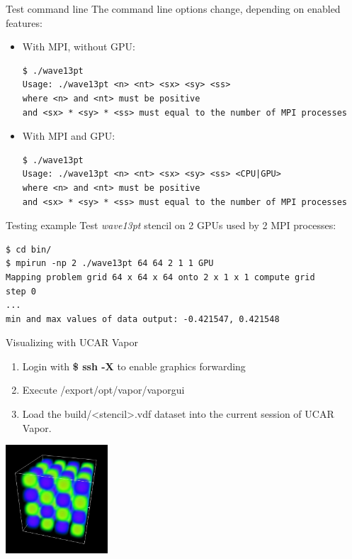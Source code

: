 \documentclass{beamer}
\begin{document}
\begin{frame}[fragile]{Test command line}
The command line options change, depending on enabled features:
\begin{itemize}
\item With MPI, without GPU:
\begin{lstlisting}
$ ./wave13pt
Usage: ./wave13pt <n> <nt> <sx> <sy> <ss>
where <n> and <nt> must be positive
and <sx> * <sy> * <ss> must equal to the number of MPI processes
\end{lstlisting}
\item With MPI and GPU:
\begin{lstlisting}
$ ./wave13pt
Usage: ./wave13pt <n> <nt> <sx> <sy> <ss> <CPU|GPU>
where <n> and <nt> must be positive
and <sx> * <sy> * <ss> must equal to the number of MPI processes
\end{lstlisting}
\end{itemize}
\end{frame}

\begin{frame}[fragile]{Testing example}
Test \emph{wave13pt} stencil on 2 GPUs used by 2 MPI processes:
\begin{lstlisting}
$ cd bin/
$ mpirun -np 2 ./wave13pt 64 64 2 1 1 GPU
Mapping problem grid 64 x 64 x 64 onto 2 x 1 x 1 compute grid
step 0
...
min and max values of data output: -0.421547, 0.421548
\end{lstlisting}
\end{frame}

\begin{frame}[fragile]{Visualizing with UCAR Vapor}
\begin{enumerate}
\item Login with \textbf{\$ ssh -X} to enable graphics forwarding
\item Execute /export/opt/vapor/vaporgui
\item Load the build/<stencil>.vdf dataset into the current session of UCAR Vapor.
\end{enumerate}
\begin{center}
\includegraphics[width=3.8cm]{wave13pt}
\end{center}
\end{frame}
\end{document}
